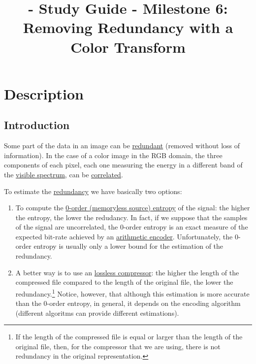 
\title{\SM{} - Study Guide - Milestone 6: Removing Redundancy with a Color Transform}

\maketitle

\tableofcontents

\section{Description}

\subsection{Introduction}
Some part of the data in an image can be
\href{https://en.wikipedia.org/wiki/Data_redundancy}{redundant}
(removed without loss of information). In the case of a color image in
the RGB domain, the three components of each pixel, each one measuring
the energy in a different band of the
\href{https://en.wikipedia.org/wiki/Visible_spectrum}{visible
  spectrum}, can be
\href{https://en.wikipedia.org/wiki/Correlation_and_dependence}{correlated}.

To estimate the
\href{https://en.wikipedia.org/wiki/Redundancy_(information_theory)}{redundancy}
we have basically two options:
\begin{enumerate}
\item To compute the
  \href{https://en.wikipedia.org/wiki/Entropy_(information_theory)}{0-order
    (memoryless source) entropy} of the signal: the higher the
  entropy, the lower the redudancy. In fact, if we suppose that the
  samples of the signal are uncorrelated, the 0-order entropy is an
  exact measure of the expected bit-rate achieved by an
  \href{https://en.wikipedia.org/wiki/Arithmetic_coding}{arithmetic
    encoder}. Unfortunately, the 0-order entropy is usually only a
  lower bound for the estimation of the redundancy.
\item A better way is to use an
  \href{https://en.wikipedia.org/wiki/Data_compression}{lossless
    compressor}: the higher the length of the compressed file compared
  to the length of the original file, the lower the
  redundancy.\footnote{If the length of the compressed file is equal or
  larger than the length of the original file, then, for the compressor
  that we are using, there is not redundancy in the original
  representation.} Notice, however, that although this estimation is
  more accurate than the 0-order entropy, in general, it depends on the
  encoding algorithm (different algoritms can provide different
  estimations).
\end{enumerate}

